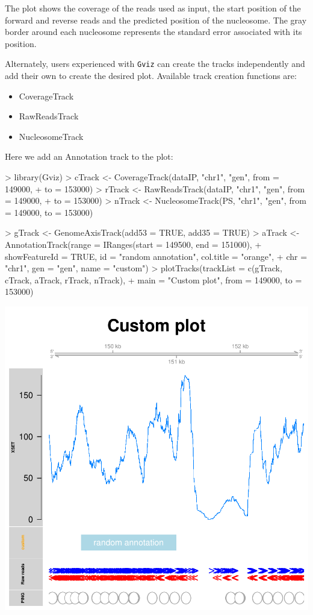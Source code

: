 \documentclass[11pt]{article}
\begin{document}
The plot shows the coverage of the reads used as input, the start position of
the forward and reverse reads and the predicted position of the nucleosome. The
gray border around each nucleosome represents the standard error associated with
its position.

Alternately, users experienced with \texttt{Gviz} can create the tracks
independently and add their own to create the desired plot.
Available track creation functions are:
\begin{itemize}
\item CoverageTrack
\item RawReadsTrack
\item NucleosomeTrack
\end{itemize}

Here we add an Annotation track to the plot:
\begin{Schunk}
\begin{Sinput}
> library(Gviz)
> cTrack <- CoverageTrack(dataIP, "chr1", "gen", from = 149000, 
+     to = 153000)
> rTrack <- RawReadsTrack(dataIP, "chr1", "gen", from = 149000, 
+     to = 153000)
> nTrack <- NucleosomeTrack(PS, "chr1", "gen", from = 149000, to = 153000)
\end{Sinput}
\end{Schunk}

\begin{Schunk}
\begin{Sinput}
> gTrack <- GenomeAxisTrack(add53 = TRUE, add35 = TRUE)
> aTrack <- AnnotationTrack(range = IRanges(start = 149500, end = 151000), 
+     showFeatureId = TRUE, id = "random annotation", col.title = "orange", 
+     chr = "chr1", gen = "gen", name = "custom")
> plotTracks(trackList = c(gTrack, cTrack, aTrack, rTrack, nTrack), 
+     main = "Custom plot", from = 149000, to = 153000)
\end{Sinput}
\end{Schunk}
\includegraphics{PING-Gviz-tracks}
\end{document}
